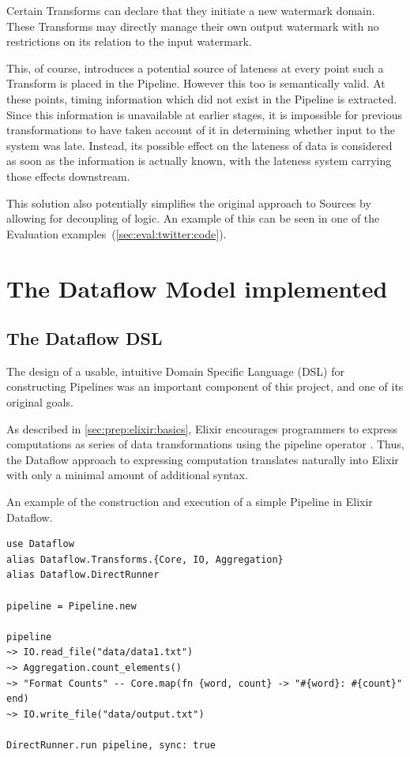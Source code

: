 Certain Transforms can declare that they initiate a new watermark domain.
These Transforms may directly manage their own output watermark with no restrictions on its relation to the input watermark.

This, of course, introduces a potential source of lateness at every point such a Transform is placed in the Pipeline.
However this too is semantically valid.
At these points, timing information which did not exist in the Pipeline is extracted.
Since this information is unavailable at earlier stages, it is impossible for previous transformations to have taken account of it in determining whether input to the system was late.
Instead, its possible effect on the lateness of data is considered as soon as the information is actually known, with the lateness system carrying those effects downstream.

This solution also potentially simplifies the original approach to Sources by allowing for decoupling of logic.
An example of this can be seen in one of the Evaluation examples~(\cref{sec:eval:twitter:code}).

\section{The Dataflow Model implemented}\label{sec:impl:approach}

\subsection{The Dataflow DSL}\label{sec:impl:approach:dsl}

The design of a usable, intuitive Domain Specific Language (DSL) for constructing Pipelines was an important component of this project, and one of its original goals.

As described in \cref{sec:prep:elixir:basics}, Elixir encourages programmers to express computations as series of data transformations using the pipeline operator \exs{|>}.
Thus, the Dataflow approach to expressing computation translates naturally into Elixir with only a minimal amount of additional syntax.

\begin{listing}[h]
	\caption[An example of Pipeline construction in Elixir.]{An example of the construction and execution of a simple Pipeline in Elixir Dataflow.}
	\label{lst:impl:elixir-construct-pipeline}
	\begin{verbatim}
use Dataflow
alias Dataflow.Transforms.{Core, IO, Aggregation}
alias Dataflow.DirectRunner

pipeline = Pipeline.new

pipeline
~> IO.read_file("data/data1.txt")
~> Aggregation.count_elements()
~> "Format Counts" -- Core.map(fn {word, count} -> "#{word}: #{count}" end)
~> IO.write_file("data/output.txt")

DirectRunner.run pipeline, sync: true

	\end{verbatim}
\end{listing}

